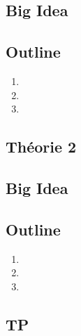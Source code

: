 \documentclass{article}
\begin{document}
\subsection*{Big Idea}
\subsection*{Outline}
    \begin{enumerate}
    \item
    \item
    \item
    \end{enumerate}
\subsection{Théorie 2}
\subsection*{Big Idea}
\subsection*{Outline}
    \begin{enumerate}
    \item
    \item
    \item
    \end{enumerate}
\subsection{TP}

\pagebreak
\end{document}
